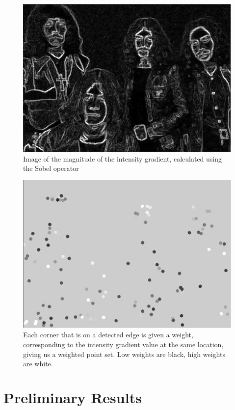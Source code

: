 \documentclass[10pt,a4paper]{article}
\begin{document}
\begin{figure}[ht!]
\centering
\includegraphics{sobel_intensity_gradient.png}
\caption{Image of the magnitude of the intensity gradient, calculated using the Sobel operator}
\label{overflow}
\end{figure}

\begin{figure}[ht!]
\centering
\includegraphics{weighted_point_set.png}
\caption{Each corner that is on a detected edge is given a weight, corresponding to the intensity gradient value at the same location, giving us a weighted point set. Low weights are black, high weights are white.}
\label{overflow}
\end{figure}

\section{Preliminary Results}
\end{document}
